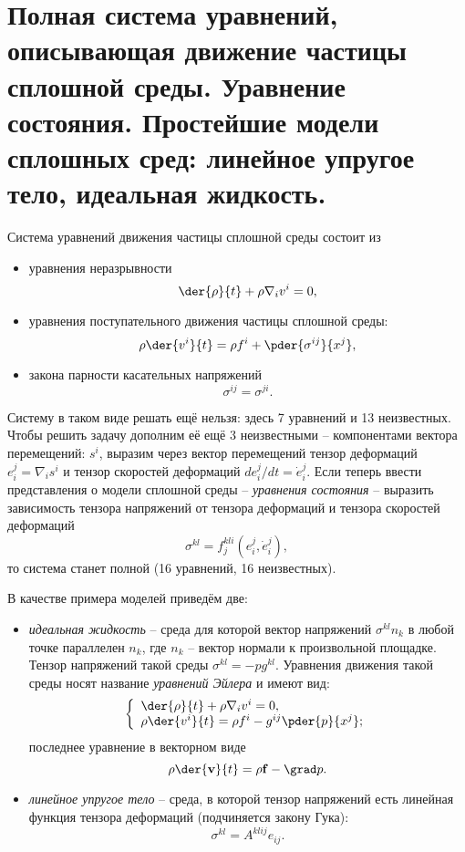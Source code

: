 \chapter{Полная система уравнений, описывающая движение частицы сплошной
среды. Уравнение состояния. Простейшие модели сплошных сред: линейное
упругое тело, идеальная жидкость.}

Система уравнений движения частицы сплошной среды состоит из
\begin{itemize}
\item уравнения неразрывности
\[
    \der{\rho }{t}+ \rho {\nabla_iv^i } = 0,
\]
\item уравнения поступательного движения частицы сплошной среды:
\[
    \rho  \der{v^i}{t}  = \rho f^i + \pder{ \sigma^{ij}}{x^j},
\]
\item закона парности касательных напряжений
\[
    \sigma^{ij} = \sigma^{ji}.
\]
\end{itemize}

Систему в таком виде решать ещё нельзя: здесь 7 уравнений и 13 неизвестных.
Чтобы решить задачу дополним её ещё 3 неизвестными -- компонентами вектора
перемещений: \( s^{i} \), выразим через вектор перемещений тензор деформаций
\( e^j_i  = \nabla_i s^i \) и тензор скоростей деформаций
\( {de^j_i}/{dt} = \dot{e}^j_i \). Если теперь ввести представления о модели
сплошной среды -- \emph{уравнения состояния} -- выразить зависимость тензора
напряжений от тензора деформаций и тензора скоростей деформаций
\[
    \sigma^{kl} = f^{kli}_j(e^j_i, \dot{e}^j_i),
\]
то система станет полной (16 уравнений, 16 неизвестных).

В качестве примера моделей приведём две:
\begin{itemize}
\item \emph{идеальная жидкость} -- среда для которой вектор напряжений
\( \sigma^{kl}n_k \) в любой точке параллелен \( n_k \), где \( n_k \) -- вектор
нормали к произвольной площадке. Тензор напряжений такой среды 
\( \sigma^{kl} = - p g^{kl} \). Уравнения движения такой среды носят название
\emph{уравнений Эйлера} и имеют вид:
\[
    \left\{\begin{array}{l}
    \der{\rho}{t} + \rho {\nabla_iv^i } = 0, \\
    \rho\der{v^i}{t}  = \rho f^i - g^{ij}\pder{p}{x^j};
    \end{array}\right.    
\]
последнее уравнение в векторном виде
\[
    \rho\der{\vec{v}}{t} = \rho\vec{f} - \grad p.
\]

\item \emph{линейное упругое тело} -- среда, в которой тензор напряжений есть
линейная функция тензора деформаций (подчиняется закону Гука):
\[
    \sigma^{kl} = A^{klij}e_{ij}.
\]
\end{itemize}

\newpage
